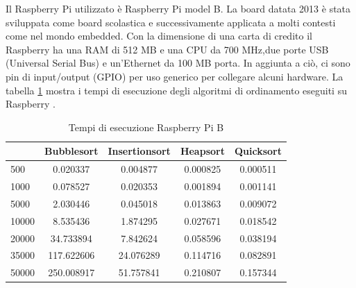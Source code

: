 \documentclass[12pt,a4paper]{report}
\begin{document}
Il Raspberry Pi utilizzato è Raspberry Pi model B. La board datata 2013 è stata sviluppata come board scolastica e successivamente applicata a molti contesti come nel mondo embedded.
Con la dimensione di una carta di credito il Raspberry ha una RAM di 512 MB e una CPU da 700 MHz,due porte USB (Universal Serial Bus) e un'Ethernet da 100 MB porta. In aggiunta a ciò, ci sono pin di input/output (GPIO) per uso generico per collegare alcuni hardware.  La tabella \ref{Tab:RaspSorting} mostra i tempi di esecuzione degli algoritmi di ordinamento eseguiti su Raspberry \cite{Rasp}.

\begin{table}[h]
		\centering
		\begin{tabular}		{| l | c | c | c | c |}
		\hline
		      & Bubblesort & Insertionsort & Heapsort & Quicksort \\ \hline
500   & 0.020337      & 0.004877      & 0.000825 & 0.000511     \\ \hline
1000  & 0.078527	    & 0.020353      & 0.001894 & 0.001141     \\ \hline
5000  & 2.030446      & 0.045018     & 0.013863  & 0.009072   \\ \hline
10000 & 8.535436      & 1.874295     & 0.027671 & 0.018542     \\ \hline
20000 & 34.733894   & 7.842624      & 0.058596  & 0.038194   \\ \hline
35000 & 117.622606     & 24.076289     & 0.114716  & 0.082891   \\ \hline
50000 & 250.008917     & 51.757841   & 0.210807  & 0.157344  \\ \hline

		\end{tabular}
		\caption{Tempi di esecuzione Raspberry Pi B}
		\label{Tab:RaspSorting}
			\end{table}
\end{document}
